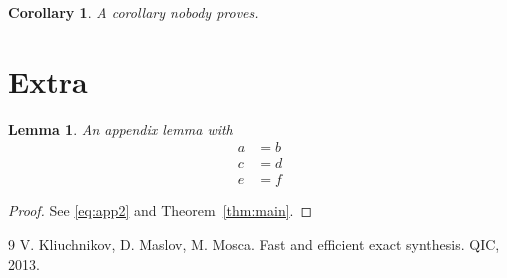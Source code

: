 \documentclass{amsart}
\newtheorem{lemma}[theorem]{Lemma}
\newtheorem{corollary}[theorem]{Corollary}
\theoremstyle{definition}
\numberwithin{equation}{section}
\begin{document}
\begin{corollary}\label{cor:unproved}
A corollary nobody proves.
\end{corollary}

\appendix
\section{Extra}
\begin{lemma}\label{lem:app}
An appendix lemma with
\begin{align}
a &= b \label{eq:app1}\\
c &= d \nonumber\\
e &= f \label{eq:app2}
\end{align}
\end{lemma}
\begin{proof}
See \eqref{eq:app2} and Theorem~\ref{thm:main}.
\end{proof}

\begin{thebibliography}{9}
 V. Kliuchnikov, D. Maslov, M. Mosca. \newblock Fast and efficient exact synthesis. \newblock QIC, 2013.
\end{thebibliography}
\end{document}
